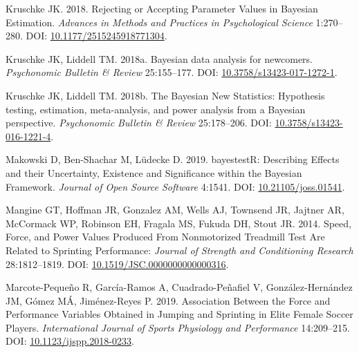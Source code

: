 \documentclass[fleqn,10pt,lineno]{wlpeerj} %
\newlength{\cslhangindent}
\newlength{\cslentryspacingunit} %
\newenvironment{CSLReferences}[2] %
 {%
  \setlength{\parindent}{0pt}
  \ifodd #1
  \let\oldpar\par
  \def\par{\hangindent=\cslhangindent\oldpar}
  \fi
  \setlength{\parskip}{#2\cslentryspacingunit}
 }%
 {}
\begin{document}
\begin{CSLReferences}{1}{0}
\leavevmode{}%
Kruschke JK. 2018. Rejecting or {Accepting Parameter Values} in {Bayesian Estimation}. \emph{Advances in Methods and Practices in Psychological Science} 1:270--280. DOI: \href{https://doi.org/10.1177/2515245918771304}{10.1177/2515245918771304}.

\leavevmode{}%
Kruschke JK, Liddell TM. 2018a. Bayesian data analysis for newcomers. \emph{Psychonomic Bulletin \& Review} 25:155--177. DOI: \href{https://doi.org/10.3758/s13423-017-1272-1}{10.3758/s13423-017-1272-1}.

\leavevmode{}%
Kruschke JK, Liddell TM. 2018b. The {Bayesian New Statistics}: {Hypothesis} testing, estimation, meta-analysis, and power analysis from a {Bayesian} perspective. \emph{Psychonomic Bulletin \& Review} 25:178--206. DOI: \href{https://doi.org/10.3758/s13423-016-1221-4}{10.3758/s13423-016-1221-4}.

\leavevmode{}%
Makowski D, Ben-Shachar M, Lüdecke D. 2019. {bayestestR}: {Describing Effects} and their {Uncertainty}, {Existence} and {Significance} within the {Bayesian Framework}. \emph{Journal of Open Source Software} 4:1541. DOI: \href{https://doi.org/10.21105/joss.01541}{10.21105/joss.01541}.

\leavevmode{}%
Mangine GT, Hoffman JR, Gonzalez AM, Wells AJ, Townsend JR, Jajtner AR, McCormack WP, Robinson EH, Fragala MS, Fukuda DH, Stout JR. 2014. Speed, {Force}, and {Power Values Produced From Nonmotorized Treadmill Test Are Related} to {Sprinting Performance}: \emph{Journal of Strength and Conditioning Research} 28:1812--1819. DOI: \href{https://doi.org/10.1519/JSC.0000000000000316}{10.1519/JSC.0000000000000316}.

\leavevmode{}%
Marcote-Pequeño R, García-Ramos A, Cuadrado-Peñafiel V, González-Hernández JM, Gómez MÁ, Jiménez-Reyes P. 2019. Association {Between} the {Force} and {Performance Variables Obtained} in {Jumping} and {Sprinting} in {Elite Female Soccer Players}. \emph{International Journal of Sports Physiology and Performance} 14:209--215. DOI: \href{https://doi.org/10.1123/ijspp.2018-0233}{10.1123/ijspp.2018-0233}.


\end{CSLReferences}
\end{document}
